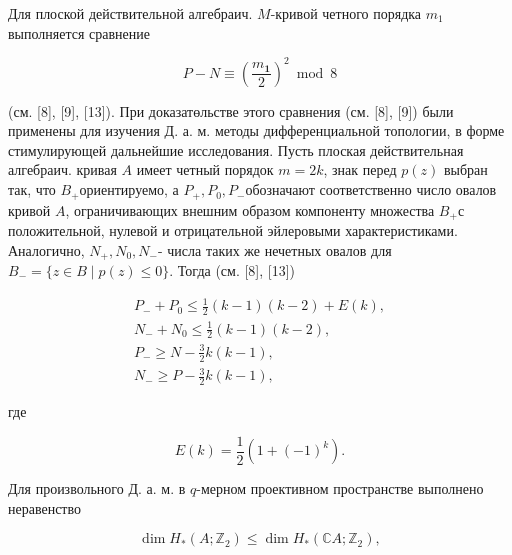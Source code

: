 \documentclass[10pt]{article}
\begin{document}
Для плоской действительной алгебраич. $M$-кривой четного порядка $m_{1}$ выполняется сравнение



\[

P-N \equiv\left(\frac{m_{\mathbf{1}}}{2}\right)^{2} \bmod 8

\]



(см. [8], [9], [13]). При доказатөльстве этого сравнения (см. [8], [9]) были применены для изучения Д. а. м. методы дифференциальной топологии, в форме стимулирующей дальнейшие исследования. Пусть плоская действительная алгебраич. кривая $A$ имеет четный порядок $m=2 k$, знак перед $p(z)$ выбран так, что $B_{+}$ориентируемо, а $P_{+}, P_{0}, P_{-}$обозначают соответственно число овалов кривой $A$, ограничивающих внешним образом компоненту множества $B_{+}$с положительной, нулевой и отрицательной эйлеровыми характеристиками. Аналогично, $N_{+}, N_{0}, N_{-}$- числа таких же нечетных овалов для $B_{-}=\{z \in B \mid p(z) \leqslant 0\}$. Тогда (см. [8], [13])



\[

\begin{gathered}

P_{-}+P_{0} \leqslant \frac{1}{2}(k-1)(k-2)+E(k), \\

N_{-}+N_{0} \leqslant \frac{1}{2}(k-1)(k-2), \\

P_{-} \geqslant N-\frac{3}{2} k(k-1), \\

N_{-} \geqslant P-\frac{3}{2} k(k-1),

\end{gathered}

\]



где



\[

E(k)=\frac{1}{2}\left(1+(-1)^{k}\right) .

\]



Для произвольного Д. а. м. в $q$-мерном проективном пространстве выполнено неравенство



\[

\operatorname{dim} H_{*}\left(A ; \mathbb{Z}_{2}\right) \leqslant \operatorname{dim} H_{*}\left(\mathbb{C} A ; \mathbb{Z}_{2}\right),

\]
\end{document}
